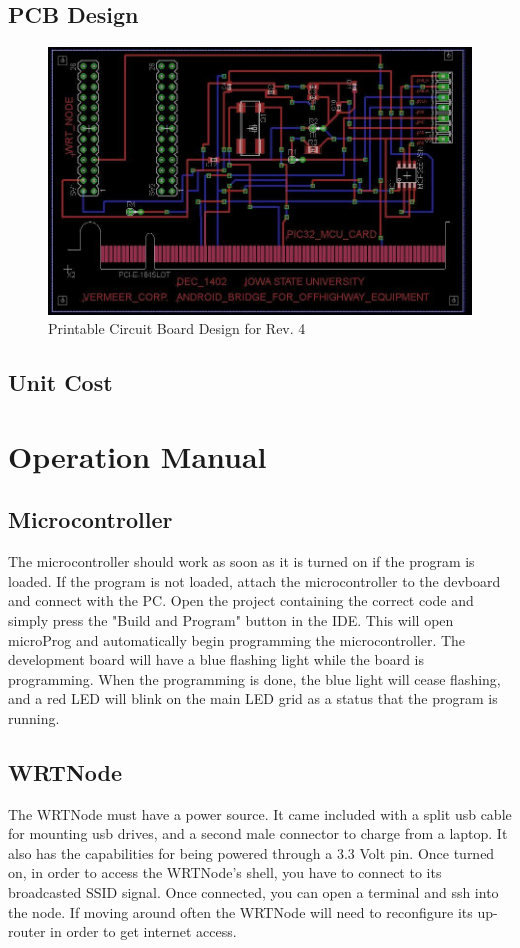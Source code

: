 \documentclass[paper=a4, fontsize=11pt]{scrartcl}
\numberwithin{equation}{section}		%
\numberwithin{figure}{section}			%
\numberwithin{table}{section}				%
\begin{document}
\subsection{PCB Design}
 \begin{figure}[ht]
	 \center\includegraphics[scale=0.3]{PCB.jpg}
 \caption{Printable Circuit Board Design for Rev. 4}
 \end{figure}

 \subsection{Unit Cost}
 

 \section{Operation Manual}
 \subsection{Microcontroller} 
 The microcontroller should work as soon as it is turned on if the program is loaded. If the program is not loaded, attach the microcontroller to the devboard and connect with the PC. Open the project containing the correct code and simply press the "Build and Program" button in the IDE. This will open microProg and automatically begin programming the microcontroller. The development board will have a blue flashing light while the board is programming. When the programming is done, the blue light will cease flashing, and a red LED will blink on the main LED grid as a status that the program is running. \\
 \subsection{WRTNode}
 The WRTNode must have a power source. It came included with a split usb cable for mounting usb drives, and a second male connector to charge from a laptop. It also has the capabilities for being powered through a 3.3 Volt pin. Once turned on, in order to access the WRTNode's shell, you have to connect to its broadcasted SSID signal. Once connected, you can open a terminal and ssh into the node. If moving around often the WRTNode will need to reconfigure its up-router in order to get internet access.\\
\end{document}
